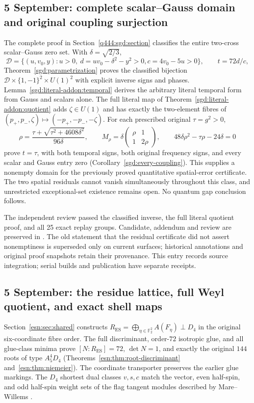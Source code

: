 \subsection*{5 September: complete scalar--Gauss domain and original coupling surjection}
The complete proof in Section~\ref{q444:sgd:section} classifies the entire
two-cross scalar--Gauss zero set. With $\delta=\sqrt{2/3}$,
\[
 \mathcal D=\{(u,v_0,y):u>0,\ d=uv_0-\delta^2-y^2>0,
 c=4v_0-5u>0\},\qquad t=72d/c,
\]
Theorem~\ref{sgd:parametrization} proves the classified bijection
$\mathcal D\times\{1,-1\}^2\times U(1)^2$ with explicit inverse signs
and phases. Lemma~\ref{sgd:literal-addon:temporal} derives the arbitrary
literal temporal form from Gauss and scalars alone. The full literal map
of Theorem~\ref{sgd:literal-addon:quotient} adds $\zeta\in U(1)$ and has
exactly the two-element fibres of
$(p_+,p_-,\zeta)\mapsto(-p_+,-p_-,-\zeta)$.
For each prescribed original $\tau=g^2>0$,
\[
 \rho=\frac{\tau+\sqrt{\tau^2+4608\delta^2}}{96\delta},\qquad
 M_\rho=\delta\begin{pmatrix}\rho&1\\1&2\rho\end{pmatrix},\qquad
 48\delta\rho^2-\tau\rho-24\delta=0
\]
prove $t=\tau$, with both temporal signs, both original frequency signs,
and every scalar and Gauss entry zero (Corollary~\ref{sgd:every-coupling}).
This supplies a nonempty domain for the previously proved quantitative
spatial-error certificate. The two spatial residuals cannot vanish simultaneously
throughout this class, and unrestricted exceptional-set existence remains
open. No quantum gap conclusion follows.

The independent review passed the classified inverse, the full literal
quotient proof, and all 25 exact replay groups. Candidate, addendum and
review are preserved in
.
The old statement that the residual certificate did not assert
nonemptiness is superseded only on current surfaces; historical annotations
and original proof snapshots retain their provenance. This entry records
source integration; serial builds and publication have separate receipts.

\subsection*{5 September: the residue lattice, full Weyl quotient, and exact shell maps}
Section~\ref{esn:sec:shared} constructs
$R_{\mathrm{ES}}=\bigoplus_{\eta\in\mathbb F_2^2}A(F_\eta)\perp D_4$
in the original six-coordinate fibre order. The full discriminant,
order-$72$ isotropic glue, and all glue-class minima prove
$[N:R_{\mathrm{ES}}]=72$, $\det N=1$, and exactly the original
$144$ roots of type $A_5^4D_4$
(Theorems~\ref{esn:thm:root-discriminant} and~\ref{esn:thm:niemeier}).
The coordinate transporter preserves the earlier glue markings. The
$D_4$ shortest dual classes $v,s,c$ match the vector, even half-spin,
and odd half-spin weight sets of the flag tangent modules described
by Mare--Willems \cite{esn:MareWillems2013}.

